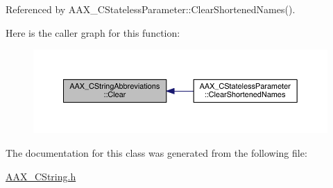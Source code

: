 Referenced by A\+A\+X\+\_\+\+C\+Stateless\+Parameter\+::\+Clear\+Shortened\+Names().



Here is the caller graph for this function\+:
\nopagebreak
\begin{figure}[H]
\begin{center}
\leavevmode
\includegraphics[width=350pt]{a00043_a6f909da041fa1bd21dfa28f1e384417e_icgraph}
\end{center}
\end{figure}




The documentation for this class was generated from the following file\+:\begin{DoxyCompactItemize}
\item 
\hyperlink{a00197}{A\+A\+X\+\_\+\+C\+String.\+h}\end{DoxyCompactItemize}
